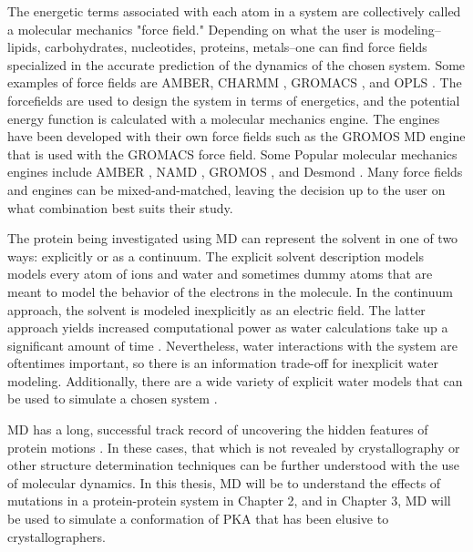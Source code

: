 \documentclass[12pt]{ucsddissertation}
\begin{document}
\begin{dissertationintroduction}
The energetic terms associated with each atom in a system are collectively called a molecular mechanics "force field." Depending on what the user is modeling-- lipids, carbohydrates, nucleotides, proteins, metals--one can find force fields specialized in the accurate prediction of the dynamics of the chosen system. Some examples of force fields are AMBER\cite{CaseD.A.BetzR.M.CeruttiD.S.CheathamT.E.IIIDardenT.A.DukeR.E.GieseT.J.GohlkeH.GoetzA.W.HomeyerN.IzadiS.JanowskiP.KausJ.KovalenkoA.LeeT.S.LeGrandS.LiP.LuchkoT.LuoR.MadejB.MerzK.M.MonardG.2015}, CHARMM \cite{Brooks2009}, GROMACS \cite{VanDerSpoel2005}, and OPLS \cite{Damm1997}. The forcefields are used to design the system in terms of energetics, and the potential energy function is calculated with a molecular mechanics engine. The engines have been developed with their own force fields such as the GROMOS MD engine \cite{Christen2005} that is used with the GROMACS force field. Some Popular molecular mechanics engines include AMBER \cite{Pearlman1995}, NAMD \cite{Nelson1996}, GROMOS \cite{Christen2005}, and Desmond \cite{Bowers2006}. Many force fields and engines can be mixed-and-matched, leaving the decision up to the user on what combination best suits their study.

The protein being investigated using MD can represent the solvent in one of two ways: explicitly or as a continuum. The explicit solvent description models models every atom of ions and water and sometimes dummy atoms that are meant to model the behavior of the electrons in the molecule. In the continuum approach, the solvent is modeled inexplicitly as an electric field. The latter approach yields increased computational power as water calculations take up a significant amount of time \cite{Anandakrishnan2015}. Nevertheless, water interactions with the system are oftentimes important, so there is an information trade-off for inexplicit water modeling. Additionally, there are a wide variety of explicit water models that can be used to simulate a chosen system \cite{Florova2010}. 

MD has a long, successful track record of uncovering the hidden features of protein motions \cite{Hospital2015}. In these cases, that which is not revealed by crystallography or other structure determination techniques can be further understood with the use of molecular dynamics. In this thesis, MD will be to understand the effects of mutations in a protein-protein system in Chapter 2, and in Chapter 3, MD will be used to simulate a conformation of PKA that has been elusive to crystallographers.


\end{dissertationintroduction}
\end{document}
